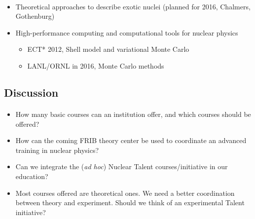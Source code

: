 \documentclass[%
twoside,                 %
final,                   %
10pt]{article}
\begin{document}
\paragraph{}
\begin{itemize}
\item Theoretical approaches to describe  exotic nuclei (planned for 2016, Chalmers, Gothenburg)

\item High-performance computing and computational tools for nuclear physics
\begin{itemize}

  \item ECT* 2012, Shell model and variational Monte Carlo

  \item LANL/ORNL in 2016, Monte Carlo methods 
\end{itemize}

\noindent
\end{itemize}

\noindent




\subsection*{Discussion}

\paragraph{}
\begin{itemize}
\item How many basic courses can an institution offer, and which courses should be offered?

\item How can the coming FRIB theory center be used to coordinate an advanced training in nuclear physics?

\item Can we integrate the (\emph{ad hoc}) Nuclear Talent courses/initiative  in our education? 

\item Most courses offered are theoretical ones. We need a better coordination between theory and experiment. Should we think of an experimental Talent initiative? 
\end{itemize}

\noindent










\printindex
\end{document}
